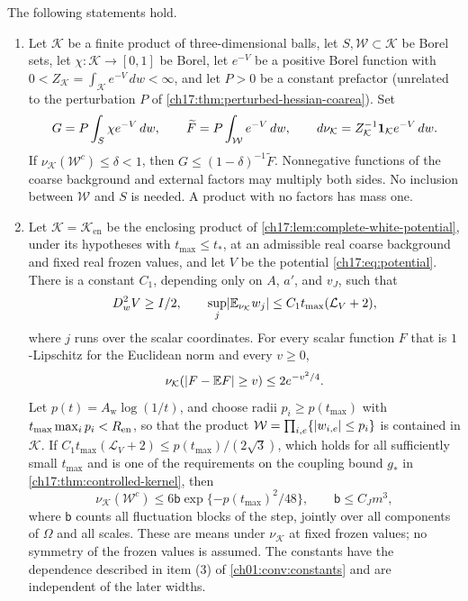 \begin{lemma}\label{ch17:lem:ambient-white-comparison}
The following statements hold.
\begin{enumerate}
\item Let $\mathcal K$ be a finite product of three-dimensional balls, let $S,\mathcal W\subset\mathcal K$ be Borel sets, let $\chi:\mathcal K\to[0,1]$ be Borel, let $e^{-V}$ be a positive Borel function with $0<Z_{\mathcal K}=\int_{\mathcal K}e^{-V}\,dw<\infty$, and let $P>0$ be a constant prefactor (unrelated to the perturbation $P$ of \cref{ch17:thm:perturbed-hessian-coarea}). Set
\[
 G=P\int_S\chi e^{-V}\,dw,\qquad\widetilde F=P\int_{\mathcal W}e^{-V}\,dw,\qquad d\nu_{\mathcal K}=Z_{\mathcal K}^{-1}\mathbf 1_{\mathcal K}e^{-V}\,dw.
\]
If $\nu_{\mathcal K}(\mathcal W^c)\le\delta<1$, then $G\le(1-\delta)^{-1}\widetilde F$. Nonnegative functions of the coarse background and external factors may multiply both sides. No inclusion between $\mathcal W$ and $S$ is needed. A product with no factors has mass one.
\item Let $\mathcal K=\mathcal K_{\mathrm{en}}$ be the enclosing product of \cref{ch17:lem:complete-white-potential}, under its hypotheses with $t_{\max}\le t_*$, at an admissible real coarse background and fixed real frozen values, and let $V$ be the potential \eqref{ch17:eq:potential}. There is a constant $C_1$, depending only on $A$, $a'$, and $v_J$, such that
\[
 D_w^2V\ge I/2,\qquad\sup_j\lvert \mathbb E_{\nu_{\mathcal K}}w_j\rvert\le C_1t_{\max}(\mathcal L_V+2),
\]
where $j$ runs over the scalar coordinates. For every scalar function $F$ that is $1$-Lipschitz for the Euclidean norm and every $v\ge0$,
\[
 \nu_{\mathcal K}(\lvert F-\mathbb E F\rvert\ge v)\le2e^{-v^2/4}.
\]
Let $p(t)=A_{\mathrm w}\log(1/t)$, and choose radii $p_i\ge p(t_{\max})$ with $t_{\max}\max_ip_i<R_{\mathrm{en}}$, so that the product $\mathcal W=\prod_{i,e}\{\lvert w_{i,e}\rvert\le p_i\}$ is contained in $\mathcal K$. If $C_1t_{\max}(\mathcal L_V+2)\le p(t_{\max})/(2\sqrt3)$, which holds for all sufficiently small $t_{\max}$ and is one of the requirements on the coupling bound $g_*$ in \cref{ch17:thm:controlled-kernel}, then
\[
 \nu_{\mathcal K}(\mathcal W^c)\le6\mathsf b\exp\{-p(t_{\max})^2/48\},\qquad\mathsf b\le C_Jm^3,
\]
where $\mathsf b$ counts all fluctuation blocks of the step, jointly over all components of $\Omega$ and all scales. These are means under $\nu_{\mathcal K}$ at fixed frozen values; no symmetry of the frozen values is assumed. The constants have the dependence described in item (3) of \cref{ch01:conv:constants} and are independent of the later widths.

\end{enumerate}
\end{lemma}
